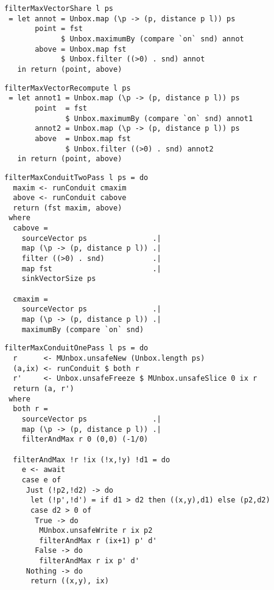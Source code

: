 \begin{lstlisting}[float,label=l:a:bench:filterMaxVectorShare,caption=Vector / share implementation of \Hs/filterMax/]
filterMaxVectorShare l ps
 = let annot = Unbox.map (\p -> (p, distance p l)) ps
       point = fst
             $ Unbox.maximumBy (compare `on` snd) annot
       above = Unbox.map fst
             $ Unbox.filter ((>0) . snd) annot
   in return (point, above)
\end{lstlisting}

\begin{lstlisting}[float,label=l:a:bench:filterMaxVectorRecompute,caption=Vector / recompute implementation of \Hs/filterMax/]
filterMaxVectorRecompute l ps
 = let annot1 = Unbox.map (\p -> (p, distance p l)) ps
       point  = fst
              $ Unbox.maximumBy (compare `on` snd) annot1
       annot2 = Unbox.map (\p -> (p, distance p l)) ps
       above  = Unbox.map fst
              $ Unbox.filter ((>0) . snd) annot2
   in return (point, above)
\end{lstlisting}

\begin{lstlisting}[float,label=l:a:bench:filterMaxConduitTwoPass,caption=Conduit two-pass implementation of \Hs/filterMax/]
filterMaxConduitTwoPass l ps = do
  maxim <- runConduit cmaxim
  above <- runConduit cabove
  return (fst maxim, above)
 where
  cabove =
    sourceVector ps               .|
    map (\p -> (p, distance p l)) .|
    filter ((>0) . snd)           .|
    map fst                       .|
    sinkVectorSize ps

  cmaxim =
    sourceVector ps               .|
    map (\p -> (p, distance p l)) .|
    maximumBy (compare `on` snd)
\end{lstlisting}

\begin{lstlisting}[float,label=l:a:bench:filterMaxConduitOnePass,caption=Conduit one-pass (hand-fused) implementation of \Hs/filterMax/]
filterMaxConduitOnePass l ps = do
  r      <- MUnbox.unsafeNew (Unbox.length ps)
  (a,ix) <- runConduit $ both r
  r'     <- Unbox.unsafeFreeze $ MUnbox.unsafeSlice 0 ix r
  return (a, r')
 where
  both r =
    sourceVector ps               .|
    map (\p -> (p, distance p l)) .|
    filterAndMax r 0 (0,0) (-1/0)

  filterAndMax !r !ix (!x,!y) !d1 = do
    e <- await
    case e of
     Just (!p2,!d2) -> do
      let (!p',!d') = if d1 > d2 then ((x,y),d1) else (p2,d2)
      case d2 > 0 of
       True -> do
        MUnbox.unsafeWrite r ix p2
        filterAndMax r (ix+1) p' d'
       False -> do
        filterAndMax r ix p' d'
     Nothing -> do
      return ((x,y), ix)
\end{lstlisting}

